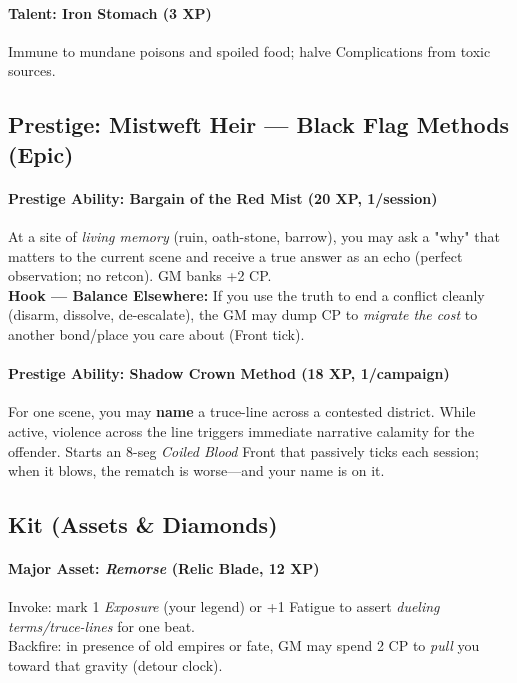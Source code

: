 \paragraph{Talent: Iron Stomach (3 XP)}
Immune to mundane poisons and spoiled food; halve Complications from toxic sources.

\subsection{Prestige: Mistweft Heir — Black Flag Methods (Epic)}
\paragraph{Prestige Ability: Bargain of the Red Mist (20 XP, 1/session)}
At a site of \emph{living memory} (ruin, oath-stone, barrow), you may ask a "why" that matters to the current scene and receive a true answer as an echo (perfect observation; no retcon). GM banks +2 CP. \\
\textbf{Hook — Balance Elsewhere:} If you use the truth to end a conflict cleanly (disarm, dissolve, de-escalate), the GM may dump CP to \emph{migrate the cost} to another bond/place you care about (Front tick).

\paragraph{Prestige Ability: Shadow Crown Method (18 XP, 1/campaign)}
For one scene, you may \textbf{name} a truce-line across a contested district. While active, violence across the line triggers immediate narrative calamity for the offender. Starts an 8-seg \emph{Coiled Blood} Front that passively ticks each session; when it blows, the rematch is worse—and your name is on it.

\subsection{Kit (Assets \& Diamonds)}
\paragraph{Major Asset: \emph{Remorse} (Relic Blade, 12 XP)}
Invoke: mark 1 \emph{Exposure} (your legend) or +1 Fatigue to assert \emph{dueling terms/truce-lines} for one beat. \\
Backfire: in presence of old empires or fate, GM may spend 2 CP to \emph{pull} you toward that gravity (detour clock).

